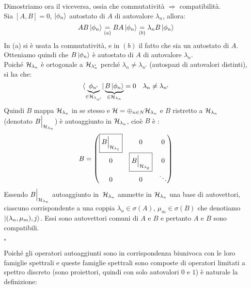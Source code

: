 \documentclass[../../FisicaTeorica.tex]{subfiles}
\begin{document}
Dimostriamo ora il viceversa, ossia che commutatività $\Rightarrow$ compatibilità.\\
Sia $[A,B]=0$, $\ket{\phi_n}$ autostato di $A$ di autovalore $\lambda_n$, allora:
\[
AB\ket{\phi_n}\underset{(a)}{=}BA\ket{\phi_n} \underset{(b)}{=} \lambda_n B\ket{\phi_n}
\]
In (a) si è usata la commutatività, e in $(b)$ il fatto che sia un autostato di $A$. Otteniamo quindi che $B\ket{\phi_n}$ è autostato di $A$ di autovalore $\lambda_n$.\\
Poiché $\mathcal{H}_{\lambda_n}$ è ortogonale a $\mathcal{H}_{\lambda_n'}$ perché $\lambda_n\neq \lambda_{n'}$ (autospazi di autovalori distinti), si ha che:
\[
\bra{\underbrace{\phi_{n'}}_{\in \mathcal{H}_{\lambda_{n'}}}}\underbrace{B \ket{\phi_n}}_{\in \mathcal{H}_{\lambda_n}}=0 \quad \lambda_n \neq \lambda_{n'}
\]
Quindi $B$ mappa $\mathcal{H}_{\lambda_n}$ in se stesso e $\mathcal{H}=\oplus_{n\in N}\mathcal{H}_{\lambda_n}$ e $B$ ristretto a $\mathcal{H}_{\lambda_n}$ (denotato $B\Big|_{\mathcal{H}_{\lambda_n}}$) è autoaggiunto in $\mathcal{H}_{\lambda_n}$, cioè $B$ è :
\[
B=\begin{pmatrix}
\boxed{B\Big|_{\mathcal{H}_{\lambda_1}}} & 0 & 0\\
0 & \boxed{B\Big|_{\mathcal{H}_{\lambda_2}}} & 0\\
0 & 0 & \ddots
\end{pmatrix}
\]
Essendo $B\Big|_{\mathcal{H}_{\lambda_n}}$ autoaggiunto in\ $\mathcal{H}_{\lambda_n}$ ammette in $\mathcal{H}_{\lambda_n}$ una base di autovettori, ciascuno corrispondente a una coppia $\lambda_n \in \sigma(A)$, $\mu_m \in \sigma(B)$ che denotiamo $\ket{(\lambda_n, \mu_m), j}$. Essi sono autovettori comuni di $A$ e $B$ e pertanto $A$ e $B$ sono compatibili.
\begin{flushright}
$\square$
\end{flushright}

Poiché gli operatori autoaggiunti sono in corrispondenza biunivoca con le loro famiglie spettrali e queste famiglie spettrali sono composte di operatori limitati a spettro discreto (sono proiettori, quindi con solo autovalori $0$ e $1$) è naturale la definizione:
\end{document}

